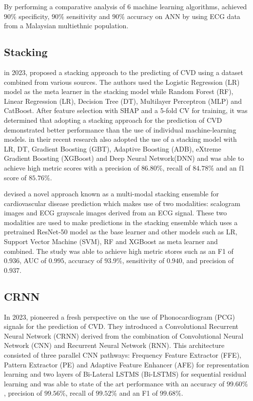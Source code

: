 \documentclass[12pt, a4paper,twoside]{report}
\numberwithin{equation}{chapter}
\begin{document}
By performing a comparative analysis of 6 machine learning algorithms, \parencite{NazrHafiMohd20209i} achieved $90\%$ specificity, $90\%$ sensitivity and $90\%$ accuracy on ANN by using ECG data from a Malaysian multiethnic population.


\subsection{Stacking}
\parencite{Subramani2023} in 2023, proposed a stacking approach to the predicting of CVD using a dataset combined from various sources. The authors used the Logistic Regression (LR) model as the meta learner in the stacking model while Random Forest (RF), Linear Regression (LR), Decision Tree (DT), Multilayer Perceptron (MLP) and CatBoost. After feature selection with SHAP and a 5-fold CV for training, it was determined that adopting a stacking approach for the prediction of CVD demonstrated better performance than the use of individual machine-learning models. \parencite{sun2024} in their recent research also adopted the use of a stacking model with LR, DT, Gradient Boosting (GBT), Adaptive Boosting (ADB), eXtreme Gradient Boosting (XGBoost) and Deep Neural Network(DNN) and was able to achieve high metric scores with a precision of $86.80\%$, recall of $84.78\%$ and an f1 score of $85.76\%$.

\parencite{jpm13020373} devised a novel approach known as a multi-modal stacking ensemble for cardiovascular disease prediction which makes use of two modalities: scalogram images and ECG grayscale images derived from an ECG signal. These two modalities are used to make predictions in the stacking ensemble which uses a pretrained ResNet-50 model as the base learner and other models such as LR, Support Vector Machine (SVM), RF and XGBoost as meta learner and combined. The study was able to achieve high metric stores such as an F1 of $0.936$, AUC of $0.995$, accuracy of $93.9\%$, sensitivity of $0.940$, and precision of $0.937$.


\subsection{CRNN}
In 2023, \parencite{shuvo} pioneered a fresh perspective on the use of Phonocardiogram (PCG) signals for the prediction of CVD. They introduced a Convolutional Recurrent Neural Network (CRNN) derived from the combination of Convolutional Neural Network (CNN) and Recurrent Neural Network (RNN). This architecture consisted of three parallel CNN pathways: Frequency Feature Extractor (FFE), Pattern Extractor (PE) and Adaptive Feature Enhancer (AFE) for representation learning and two layers of Bi-Lateral LSTMS (Bi-LSTMS) for sequential residual learning and was able to state of the art performance with an accuracy of $99.60\%$, precision of $99.56\%$, recall of $99.52\%$ and an F1 of $99.68\%$. 
\end{document}
